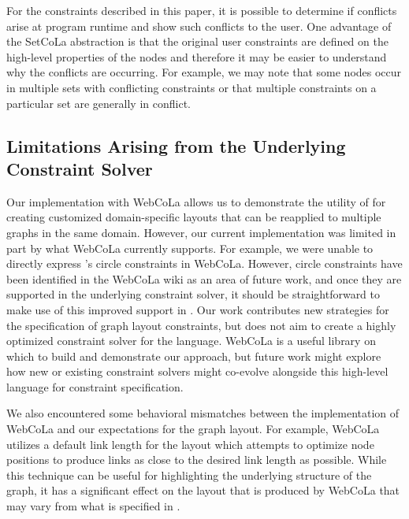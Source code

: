 For the constraints described in this paper, it is possible to determine if
conflicts arise at program runtime and show such conflicts to the user. One
advantage of the SetCoLa abstraction is that the original user constraints
are defined on the high-level properties of the nodes and therefore it may
be easier to understand why the conflicts are occurring. For example, we may
note that some nodes occur in multiple sets with conflicting constraints
or that multiple constraints on a particular set are generally in conflict.

\subsection{Limitations Arising from the Underlying Constraint Solver}



Our implementation with WebCoLa allows us to demonstrate the utility of
\projectname for creating customized domain-specific layouts that can be
reapplied to multiple graphs in the same domain. However, our current
implementation was limited in part by what WebCoLa currently supports. For
example, we were unable to directly express \projectname's circle constraints in
WebCoLa.  However, circle constraints have been identified in the WebCoLa
wiki as an area of future work, and once they are supported in the
underlying constraint solver, it should be straightforward to make use of
this improved support in \projectname.
Our work contributes new strategies for the
specification of graph layout constraints, but does not aim to create a
highly optimized constraint solver for the language. WebCoLa is a useful
library on which to build and demonstrate our approach, but 
future work might explore how new or existing constraint solvers might
co-evolve alongside this high-level language for constraint specification.

We also encountered some behavioral mismatches between the implementation
of WebCoLa and our expectations for the graph layout. For example, WebCoLa
utilizes a default link length for the layout which attempts to optimize
node positions to produce links as close to the desired link length as
possible. While this technique can be useful for highlighting the underlying 
structure of the graph, it has a significant effect on the layout that is
produced by WebCoLa that may vary from what is specified in \projectname.


